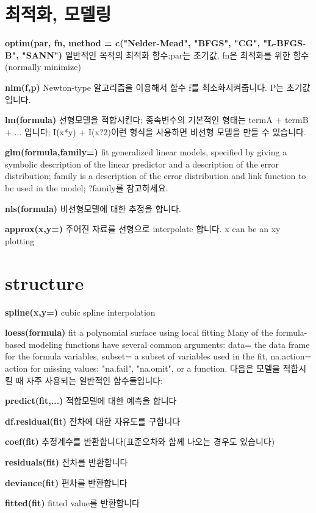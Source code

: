 \documentclass[landscape,twocolumn,letterpaper]{article}
\begin{document}
\section{최적화, 모델링}

\textbf{optim(par, fn, method = c("Nelder-Mead", "BFGS", "CG", "L-BFGS-B",
"SANN")} 일반적인
목적의 최적화 함수;par는 초기값, fn은 최적화를 위한 함수 (normally minimize)

\textbf{nlm(f,p)} Newton-type 알고리즘을 이용해서 함수 f를 최소화시켜줍니다. P는 초기값입니다.

\textbf{lm(formula)} 선형모델을 적합시킨다; 종속변수의 기본적인 형태는 termA + termB + ... 입니다; I(x*y)
+ I(x?2)이런 형식을 사용하면 비선형 모델을 만들 수 있습니다.

\textbf{glm(formula,family=)} fit generalized linear models, specified by giving
a symbolic description of the linear predictor and a description of
the error distribution; family is a description of the error distribution
and link function to be used in the model; ?family를 참고하세요.

\textbf{nls(formula)} 비선형모델에 대한 추정을 합니다.

\textbf{approx(x,y=)} 주어진 자료를 선형으로 interpolate 합니다.  x can be an xy plotting

\section{structure}

\textbf{spline(x,y=)} cubic spline interpolation

\textbf{loess(formula)} fit a polynomial surface using local fitting
Many of the formula-based modeling functions have several common arguments:
data= the data frame for the formula variables, subset= a subset of
variables used in the fit, na.action= action for missing values: "na.fail",
"na.omit", or a function. 다음은 모델을 적합시킬 때 자주 사용되는 일반적인 함수들입니다:

\textbf{predict(fit,...)} 적합모델에 대한 예측을 합니다

\textbf{df.residual(fit)} 잔차에 대한 자유도를 구합니다

\textbf{coef(fit) }추정계수를 반환합니다(표준오차와 함께 나오는 경우도 있습니다)

\textbf{residuals(fit)} 잔차를 반환합니다

\textbf{deviance(fit)} 편차를 반환합니다

\textbf{fitted(fit)} fitted value를 반환합니다
\end{document}
